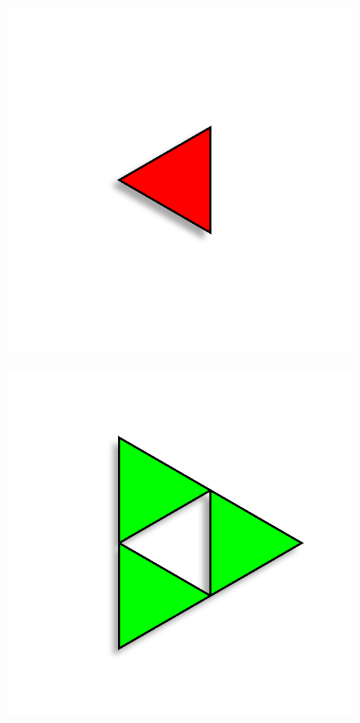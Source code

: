 \documentclass{article}
\begin{document}
\begin{figure}[H]
    \centering
    \begin{subfigure}[b]{0.1\textwidth}
        \centering
        \includegraphics[width=.9\textwidth]{graphics/behavior/center-columns/red.png}
    \end{subfigure}
    \begin{subfigure}[b]{0.1\textwidth}
        \centering
        \includegraphics[width=.9\textwidth]{graphics/behavior/center-columns/green.png}

\end{subfigure}
\end{figure}
\end{document}
